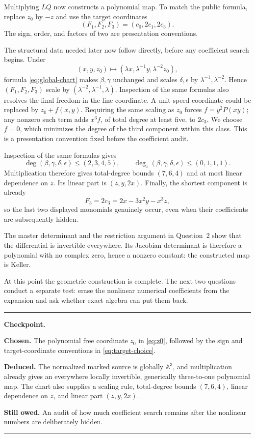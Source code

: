 \documentclass[11pt,a4paper]{article}
\numberwithin{equation}{section}
\theoremstyle{definition}
\theoremstyle{remark}
\newcommand{\A}{\mathbb A}
\newenvironment{modelanswer}
  {\par\smallskip\noindent{\color{modelgreen}\bfseries MODEL}\par\smallskip}
  {\par\medskip}
\newenvironment{checkpoint}
  {\par\smallskip\noindent\color{paperblue}\hrule\color{black}
   \vspace{0.55em}\noindent\begin{minipage}{\linewidth}\small
   \textbf{Checkpoint.}\par\smallskip}
  {\end{minipage}\vspace{0.45em}\color{paperblue}\hrule\color{black}
   \par\medskip}
\newcommand{\chosen}[1]{\textbf{Chosen.} #1\par\smallskip}
\newcommand{\deduced}[1]{\textbf{Deduced.} #1\par\smallskip}
\newcommand{\owed}[1]{\textbf{Still owed.} #1}
\begin{document}
\begin{modelanswer}
Multiplying \(LQ\) now constructs a polynomial map.  To match the public
formula, replace \(z_0\) by \(-z\) and use the target coordinates
\begin{equation}\label{eq:target-choice}
  (F_1,F_2,F_3)=(c_0,2c_1,2c_3).
\end{equation}
The sign, order, and factors of two are presentation conventions.

The structural data needed later now follow directly, before any coefficient
search begins.  Under
\[
(x,y,z_0)\longmapsto
(\lambda x,\lambda^{-1}y,\lambda^{-2}z_0),
\]
formula \eqref{eq:global-chart} makes \(\beta,\gamma\) unchanged and scales
\(\delta,\epsilon\) by \(\lambda^{-1},\lambda^{-2}\).  Hence
\((F_1,F_2,F_3)\) scale by
\((\lambda^{-2},\lambda^{-1},\lambda)\).  Inspection of the same formulas
also resolves the final freedom in the line coordinate.  A unit-speed
coordinate could be replaced by \(z_0+f(x,y)\).  Requiring the same scaling
as \(z_0\) forces \(f=y^2P(xy)\); any nonzero such term adds \(x^3f\), of
total degree at least five, to \(2c_3\).  We choose \(f=0\), which minimizes
the degree of the third component within this class.  This is a presentation
convention fixed before the coefficient audit.

Inspection of the same formulas gives
\[
 \deg(\beta,\gamma,\delta,\epsilon)\le(2,3,4,5),
 \qquad
 \deg_z(\beta,\gamma,\delta,\epsilon)\le(0,1,1,1).
\]
Multiplication therefore gives total-degree bounds \((7,6,4)\) and at most
linear dependence on \(z\).  Its linear part is \((z,y,2x)\).  Finally, the
shortest component is already
\begin{equation}\label{eq:F3-shape}
  F_3=2c_3=2x-3x^2y-x^3z,
\end{equation}
so the last two displayed monomials genuinely occur, even when their
coefficients are subsequently hidden.

The master determinant and the restriction argument in Question~2 show that
the differential is invertible everywhere.  Its Jacobian determinant is
therefore a polynomial with no complex zero, hence a nonzero constant: the
constructed map is Keller.

At this point the geometric construction is complete.  The next two
questions conduct a separate test: erase the nonlinear numerical coefficients
from the expansion and ask whether exact algebra can put them back.
\end{modelanswer}

\begin{checkpoint}
\chosen{The polynomial free coordinate \(z_0\) in \eqref{eq:z0}, followed by
the sign and target-coordinate conventions in \eqref{eq:target-choice}.}
\deduced{The normalized marked source is globally \(\A^3\), and multiplication
already gives an everywhere locally invertible, generically three-to-one
polynomial map.  The chart also supplies a scaling rule, total-degree bounds
\((7,6,4)\), linear dependence on \(z\), and linear part \((z,y,2x)\).}
\owed{An audit of how much coefficient search remains after the nonlinear
numbers are deliberately hidden.}
\end{checkpoint}
\end{document}

